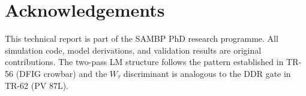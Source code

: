 \documentclass[11pt, a4paper]{article}
\newcommand{\Wtau}{W_\tau}
\begin{document}
\section*{Acknowledgements}

This technical report is part of the SAMBP PhD research programme.  All
simulation code, model derivations, and validation results are original
contributions.  The two-pass LM structure follows the pattern established in
TR-56 (DFIG crowbar) and the $\Wtau$ discriminant is analogous to the DDR
gate in TR-62 (PV 87L).



\end{document}
